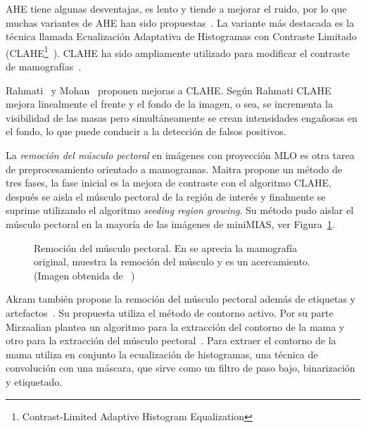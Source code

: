 AHE tiene algunas desventajas, es lento y tiende a mejorar el ruido, por lo que
muchas variantes de AHE han sido propuestas~\cite{pizer1987adaptive}. La
variante más destacada es la técnica llamada Ecualización Adaptativa de
Histogramas con Contraste Limitado (CLAHE\footnote{Contrast-Limited Adaptive
Histogram Equalization}~\cite{zuiderveld1994contrast}). CLAHE ha sido
ampliamente utilizado para modificar el contraste de
mamografías~\cite{pisano1998contrast, maitra2012technique}.

Rahmati~\cite{rahmati2010new} y Mohan~\cite{mohan2013modified} proponen mejoras
a CLAHE. Según Rahmati CLAHE mejora linealmente el frente y el fondo de la
imagen, o sea, se incrementa la visibilidad de las masas pero simultáneamente
se crean intensidades engañosas en el fondo, lo que puede conducir a la
detección de falsos positivos.

La \textit{remoción del músculo pectoral} en imágenes con proyección MLO es
otra tarea de preprocesamiento orientado a mamogramas. Maitra propone un método
de tres fases, la fase inicial es la mejora de contraste con el algoritmo
CLAHE, después se aisla el músculo pectoral de la región de interés y
finalmente se suprime utilizando el algoritmo \textit{seeding region growing}.
Su método pudo aislar el músculo pectoral en la mayoría de las imágenes de
miniMIAS, ver Figura~\ref{fig:muscle}.

\begin{figure}[h]
    \centering
    \hspace{1cm}
    \hspace{1cm}

  \caption[Remoción del músculo pectoral]
  {Remoción del músculo pectoral. En \protect{} se aprecia la
  mamografía original, \protect{} muestra la remoción del
  músculo y \protect{} es un acercamiento. (Imagen obtenida de
  ~\cite{akram2013preprocessing})} 

  \label{fig:muscle}
\end{figure}

Akram también propone la remoción del músculo pectoral además de etiquetas y
artefactos~\cite{akram2013preprocessing}. Su propuesta utiliza el método de
contorno activo. Por su parte Mirzaalian plantea un algoritmo para la
extracción del contorno de la mama y otro para la extracción del músculo
pectoral~\cite{mirzaalian2007pre}. Para extraer el contorno de la mama utiliza
en conjunto la ecualización de histogramas, una técnica de convolución con una
máscara, que sirve como un filtro de paso bajo, binarización y etiquetado.

